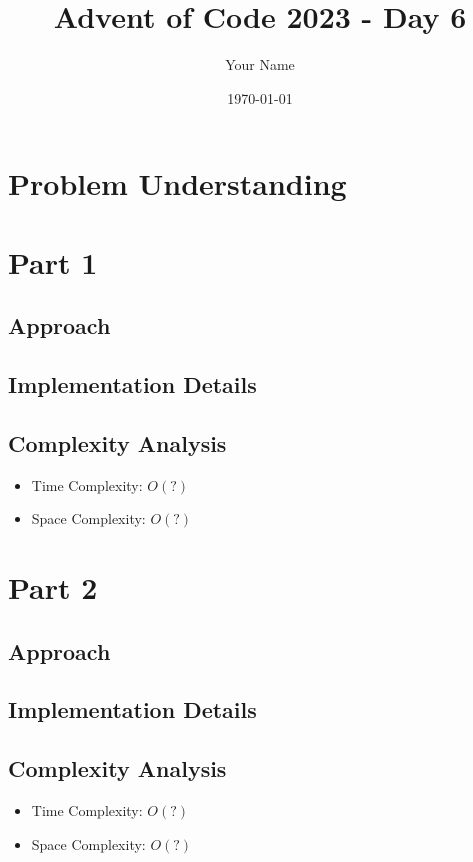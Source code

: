 \documentclass{article}
\title{Advent of Code 2023 - Day 6}
\author{Your Name}
\date{\today}
\begin{document}
\maketitle

\section{Problem Understanding}

\section{Part 1}
\subsection{Approach}

\subsection{Implementation Details}

\subsection{Complexity Analysis}
\begin{itemize}
    \item Time Complexity: $O(?)$
    \item Space Complexity: $O(?)$
\end{itemize}

\section{Part 2}
\subsection{Approach}

\subsection{Implementation Details}

\subsection{Complexity Analysis}
\begin{itemize}
    \item Time Complexity: $O(?)$
    \item Space Complexity: $O(?)$
\end{itemize}
\end{document}

